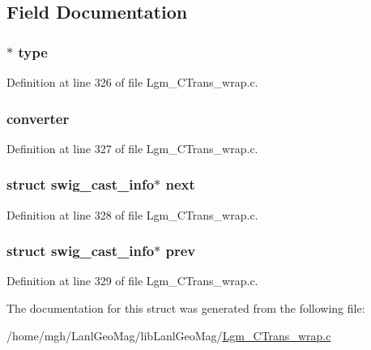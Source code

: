 \subsection{Field Documentation}
\hypertarget{structswig__cast__info_a19bc251346ad9ae4ecb3b4e34545a5d}{
\subsubsection[{type}]{$\ast$ {\bf type}}}
\label{structswig__cast__info_a19bc251346ad9ae4ecb3b4e34545a5d}




Definition at line 326 of file Lgm\_\-CTrans\_\-wrap.c.\hypertarget{structswig__cast__info_b0c02ae209c86c1a920b1a6cbec7ec52}{
\subsubsection[{converter}]{ {\bf converter}}}
\label{structswig__cast__info_b0c02ae209c86c1a920b1a6cbec7ec52}




Definition at line 327 of file Lgm\_\-CTrans\_\-wrap.c.\hypertarget{structswig__cast__info_f4349454713002040fd3799016337b36}{
\subsubsection[{next}]{\setlength{\rightskip}{0pt plus 5cm}struct {\bf swig\_\-cast\_\-info}$\ast$ {\bf next}}}
\label{structswig__cast__info_f4349454713002040fd3799016337b36}




Definition at line 328 of file Lgm\_\-CTrans\_\-wrap.c.\hypertarget{structswig__cast__info_d21cc20a49152bc851275a6747e89493}{
\subsubsection[{prev}]{\setlength{\rightskip}{0pt plus 5cm}struct {\bf swig\_\-cast\_\-info}$\ast$ {\bf prev}}}
\label{structswig__cast__info_d21cc20a49152bc851275a6747e89493}




Definition at line 329 of file Lgm\_\-CTrans\_\-wrap.c.

The documentation for this struct was generated from the following file:\begin{CompactItemize}
\item 
/home/mgh/LanlGeoMag/libLanlGeoMag/\hyperlink{_lgm___c_trans__wrap_8c}{Lgm\_\-CTrans\_\-wrap.c}\end{CompactItemize}
